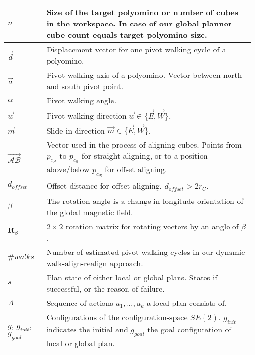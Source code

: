 \begin{xltabular}{\textwidth}{ l  X }
	$n$
	&
	Size of the target polyomino or number of cubes in the workspace.
	In case of our global planner cube count equals target polyomino size.
	\\ \midrule
	
	$\vec{d}$
	&
	Displacement vector for one pivot walking cycle of a polyomino.
	\\ \midrule
	
	$\vec{a}$
	&
	Pivot walking axis of a polyomino.
	Vector between north and south pivot point.
	\\ \midrule
	
	$\alpha$
	&
	Pivot walking angle.
	\\ \midrule
	
	$\vec{w}$
	&
	Pivot walking direction $\vec{w} \in \{ \vec{E}, \vec{W} \}$.
	\\ \midrule
	
	$\vec{m}$
	&
	Slide-in direction $\vec{m} \in \{ \vec{E}, \vec{W} \}$.
	\\ \midrule
	
	$\overrightarrow{\mathcal{A}\mathcal{B}}$
	&
	Vector used in the process of aligning cubes.
	Points from $p_{c_\mathcal{A}}$ to $p_{c_\mathcal{B}}$ for straight aligning, or to a position above/below $p_{c_\mathcal{B}}$ for offset aligning.
	\\ \midrule
	
	$d_\textit{offset}$
	&
	Offset distance for offset aligning.
	$d_\textit{offset} > 2 r_C$.
	\\ \midrule
	
	$\beta$  
	&
	The rotation angle is a change in longitude orientation of the global magnetic field.
	\\ \midrule
	
	$\mathbf{R}_\beta$  
	&
	$2 \times 2$ rotation matrix for rotating vectors by an angle of $\beta$.
	\\ \midrule
	
	$\#\textit{walks}$
	&
	Number of estimated pivot walking cycles in our dynamic walk-align-realign approach.
	\\ \midrule
	
	$s$
	&
	Plan state of either local or global plans. States if successful, or the reason of failure.
	\\ \midrule
	
	$A$
	&
	Sequence of actions $a_1, ... , a_k$ a local plan consists of.
	\\ \midrule
		
	$g$, $g_\textit{init}$, $g_\textit{goal}$
	&
	Configurations of the configuration-space $\textit{SE}(2)$. $g_\textit{init}$ indicates the initial and $g_\textit{goal}$ the goal configuration of local or global plan.
	\\ \midrule
	

\end{xltabular}
